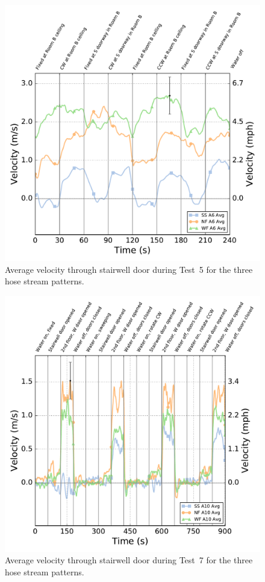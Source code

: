 \documentclass[12pt,oneside]{book}
\begin{document}
\begin{figure}[!ht]
	\includegraphics[width=0.86\columnwidth]{../Figures/Plots/HOSE_IXAOXX_BDP_A6_stream_avgs}
	\caption{Average velocity through stairwell door during Test~5 for the three hose stream patterns.}
	\label{fig:Test_5_BDP_A6_Avg_All}
\end{figure}
\FloatBarrier

\begin{figure}[!ht]
	\includegraphics[width=\columnwidth]{../Figures/Plots/Test_19_West_063014_BDP_A10_stream_avgs}
	\caption{Average velocity through stairwell door during Test~7 for the three hose stream patterns.}
	\label{fig:Test_7_BDP_A10_Avg_All}
\end{figure}

\clearpage
\end{document}
